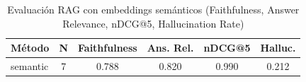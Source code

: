 \begin{table}[htbp]
\centering
\caption{Evaluación RAG con embeddings semánticos (Faithfulness, Answer Relevance, nDCG@5, Hallucination Rate)}
\begin{tabular}{lccccc}
\toprule
Método & N & Faithfulness & Ans. Rel. & nDCG@5 & Halluc. \\
\midrule
semantic & 7 & 0.788 & 0.820 & 0.990 & 0.212 \\
\bottomrule
\end{tabular}

\label{tab:rag-eval-metrics}
\end{table}
